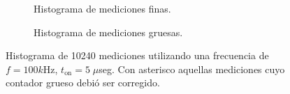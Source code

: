 \begin{figure}[H]
     \centering
     \begin{subfigure}[t]{0.45\textwidth} %
           \centering
           \caption{Histograma de mediciones finas.}
           \label{fig: histograma_66}
     \end{subfigure}%
     \hspace{10pt}%
     \begin{subfigure}[t]{0.4\textwidth} %
           \centering
           \caption{Histograma de mediciones gruesas.}
     \end{subfigure}
     \caption{Histograma de 10240 mediciones utilizando una frecuencia de $f=100k$Hz, $t_{\text{on}}=5 \; \mu$seg. 
     Con asterisco aquellas mediciones cuyo contador grueso debió ser corregido.}
\end{figure}

